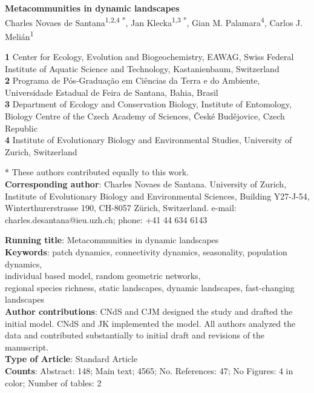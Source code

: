 \documentclass[a4paper,12pt]{article}
\date{}
\begin{document}
\begin{flushleft}
{\Large
\textbf{Metacommunities in dynamic landscapes}}
\\
\vspace{0.5cm} Charles Novaes de Santana\textsuperscript{1,2,4 *}, Jan
Klecka\textsuperscript{1,3 *}, Gian M. Palamara\textsuperscript{4}, Carlos J. Meli\'an\textsuperscript{1}
\\
\bigskip

\textbf{1} Center for Ecology, Evolution and Biogeochemistry, EAWAG,
Swiss Federal Institute of Aquatic Science and Technology, Kastanienbaum, Switzerland
\\
\textbf{2} Programa de P\'{o}s-Graduaç\~{a}o em Ci\^{e}ncias da Terra e do Ambiente,
Universidade Estadual de Feira de Santana, Bahia, Brasil
\\
\textbf{3} Department of Ecology and Conservation Biology, Institute of Entomology,
Biology Centre of the Czech Academy of Sciences, \v{C}esk\'{e}
Bud\v{e}jovice, Czech Republic\\
\textbf{4} Institute of Evolutionary Biology and Environmental Studies, University of Zurich, Switzerland\\
\bigskip

* These authors contributed equally to this work.\\
\textbf{Corresponding author}: Charles Novaes de Santana. University of Zurich, Institute of Evolutionary Biology and Environmental Sciences, Building Y27-J-54, Winterthurerstrasse 190, CH-8057 Zürich, Switzerland. e-mail: charles.desantana@ieu.uzh.ch; phone: +41 44 634 6143\\
\bigskip

  \textbf{Running title}: Metacommunities in dynamic landscapes\\

  \textbf{Keywords}: patch dynamics, connectivity dynamics, seasonality, population dynamics, \\ individual based model, random geometric networks,\\
  regional species richness, static landscapes, dynamic landscapes, fast-changing landscapes\\

  \textbf{Author contributions}: CNdS and CJM designed the study and drafted the initial model. CNdS and JK implemented the model. All authors analyzed the data and contributed substantially to initial draft and revisions of the manuscript.  
  \\
  \textbf{Type of Article}: Standard Article\\

  \textbf{Counts}: Abstract: 148; Main text; 4565; No. References: 47; No Figures: 4 in color; Number of tables: 2\\
\end{flushleft}
\end{document}
